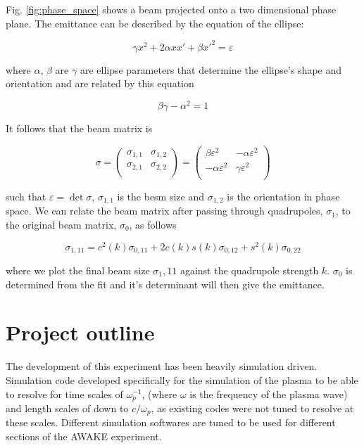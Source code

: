 \documentclass[a4paper]{report}
\begin{document}
Fig. \ref{fig:phase_space} shows a beam projected onto a two dimensional phase
plane. The emittance can be described by the equation of the ellipse:

\[ \gamma x^2 + 2\alpha xx' + \beta x'^2 = \varepsilon \]

where \(\alpha\),  \(\beta\) are \(\gamma\) are ellipse parameters that
determine the ellipse's shape and orientation and are related by this equation

\[ \beta\gamma - \alpha^2 = 1 \]



It follows that the beam matrix is

\[\sigma =
	\begin{pmatrix}
	  \sigma_{1,1} & \sigma_{1,2} \\
	  \sigma_{2,1} & \sigma_{2,2} \\
	\end{pmatrix}
	=
	\begin{pmatrix}
	  \beta\varepsilon^2 & -\alpha\varepsilon^2 \\
	  -\alpha\varepsilon^2 & \gamma\varepsilon^2 \\
	\end{pmatrix}
\]

such that \(\varepsilon = \det\sigma\), \(\sigma_{1,1}\) is the besm size and
\(\sigma_{1,2}\) is the orientation in phase space. We can relate the beam
matrix after passing through quadrupoles, \(\sigma_1\), to the original beam
matrix, \(\sigma_0\), as follows

\[
	\sigma_{1,11} = c^2(k)\sigma_{0,11} + 2c(k)s(k)\sigma_{0,12} +
	s^2(k)\sigma_{0,22}
\]

where we plot the final beam size \(\sigma_1,11\) against the quadrupole
strength \(k\).  \(\sigma_0\) is determined from the fit and it's determinant
will then give the emittance.


\chapter{Project outline}

The development of this experiment has been heavily simulation driven.
Simulation code developed specifically for the simulation of the plasma to be
able to resolve for time scales of \(\omega_p^{-1}\), (where \(\omega\) is the
frequency of the plasma wave) and length scales of down to \(c/\omega_p\), as
existing codes were not tuned to resolve at these scales.  Different simulation
softwares are tuned to be used for different sections of the AWAKE experiment.
\end{document}
